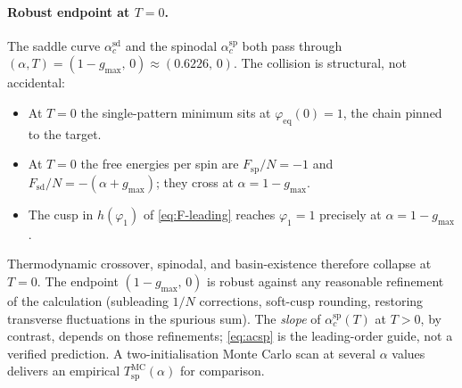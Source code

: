 \documentclass[11pt]{article}
\newcommand{\acSd}{\alpha_c^{\mathrm{sd}}}
\newcommand{\acSp}{\alpha_c^{\mathrm{sp}}}
\begin{document}
\paragraph{Robust endpoint at $T = 0$.}
\label{sec:mc:spinodal-endpoint}
The saddle curve $\acSd$ and the spinodal $\acSp$ both pass
through $(\alpha, T) = (1 - g_{\max},\,0) \approx (0.6226,\,0)$.
The collision is structural, not accidental:
\begin{itemize}
\item At $T=0$ the single-pattern minimum sits at
$\varphi_{\mathrm{eq}}(0) = 1$, the chain pinned to the target.
\item At $T=0$ the free energies per spin are
$F_{\mathrm{sp}}/N = -1$ and
$F_{\mathrm{sd}}/N = -(\alpha + g_{\max})$; they cross at
$\alpha = 1 - g_{\max}$.
\item The cusp in $h(\varphi_1)$ of \eqref{eq:F-leading}
reaches $\varphi_1 = 1$ precisely at $\alpha = 1 - g_{\max}$.
\end{itemize}
Thermodynamic crossover, spinodal, and basin-existence therefore
collapse at $T = 0$. The endpoint
$(1 - g_{\max},\,0)$ is robust against any reasonable refinement
of the calculation (subleading $1/N$ corrections, soft-cusp
rounding, restoring transverse fluctuations in the spurious sum).
The \emph{slope} of $\acSp(T)$ at $T > 0$, by contrast, depends on
those refinements; \eqref{eq:acsp} is the leading-order guide, not
a verified prediction. A two-initialisation Monte Carlo scan at
several $\alpha$ values delivers an empirical
$T_{\mathrm{sp}}^{\mathrm{MC}}(\alpha)$ for comparison.
\end{document}
